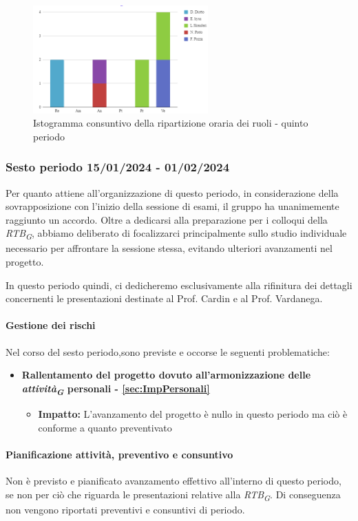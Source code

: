 \begin{figure}[H]
    \centering
    \includegraphics[width=0.6\textwidth]{../Images/consuntivoDivisioneRuoli5Periodo.png}
    \caption{Istogramma consuntivo della ripartizione oraria dei ruoli - quinto periodo}
    \label{fig:Consuntivo_ripartizione_oraria_5}
\end{figure}


\subsubsection{Sesto periodo  15/01/2024 - 01/02/2024}
Per quanto attiene all'organizzazione di questo periodo, in considerazione della sovrapposizione con l'inizio della sessione di esami, il gruppo ha unanimemente raggiunto un accordo. Oltre a dedicarsi alla preparazione per i colloqui della \textit{RTB}\textsubscript{\textit{G}}, abbiamo deliberato di focalizzarci principalmente sullo studio individuale necessario per affrontare la sessione stessa, evitando ulteriori avanzamenti nel progetto.

In questo periodo quindi, ci dedicheremo esclusivamente alla rifinitura dei dettagli concernenti le presentazioni destinate al Prof. Cardin e al Prof. Vardanega.

\paragraph{Gestione dei rischi} 
Nel corso del sesto periodo,sono previste e occorse le seguenti problematiche:
\begin{itemize}
    \item \textbf{Rallentamento del progetto dovuto all’armonizzazione delle \textit{attività}\textsubscript{\textit{G}} personali - \ref{sec:ImpPersonali}}
    \begin{itemize}
        \item \textbf{Impatto:}
       L'avanzamento del progetto è nullo in questo periodo ma ciò è conforme a quanto preventivato
    \end{itemize}
\end{itemize}
\newpage
\paragraph{Pianificazione attività, preventivo e consuntivo}\hspace{1pt}
Non è previsto e pianificato avanzamento effettivo all’interno di questo periodo, se non per ciò che riguarda
le presentazioni relative alla \textit{RTB}\textsubscript{\textit{G}}.
Di conseguenza non vengono riportati preventivi e consuntivi di periodo.
